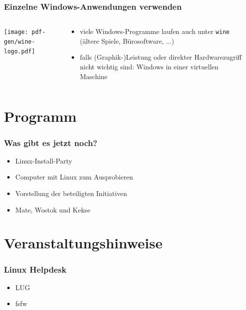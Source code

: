 \documentclass[t]{beamer}
\newcommand{\cmd}[1]{\texttt{#1}}
\begin{document}
\begin{frame}
  \frametitle{Einzelne Windows-Anwendungen verwenden}
  \begin{columns}
    \begin{column}[T]{0.35\textwidth}
      \texttt{[image: pdf-gen/wine-logo.pdf]}
    \end{column}
    \begin{column}{0.55\textwidth}
      \begin{itemize}
      \item viele Windows-Programme laufen auch unter \cmd{wine} (ältere Spiele, Bürosoftware, ...)
      \item falls (Graphik-)Leistung oder direkter Hardwarezugriff nicht wichtig sind: Windows in einer virtuellen Maschine
      \end{itemize}
    \end{column}
  \end{columns}
\end{frame}

\section{Programm}
\begin{frame}
  \frametitle{Was gibt es jetzt noch?}
  \begin{itemize}
  \item Linux-Install-Party
  \item Computer mit Linux zum Ausprobieren
  \item Vorstellung der beteiligten Initiativen
  \item Mate, Wostok und Kekse
  \end{itemize}
\end{frame}

\section{Veranstaltungshinweise}
\begin{frame}
  \frametitle{Linux Helpdesk}
  \begin{itemize}
  \item LUG
  \item fsfw
  \end{itemize}
\end{frame}

\end{document}
